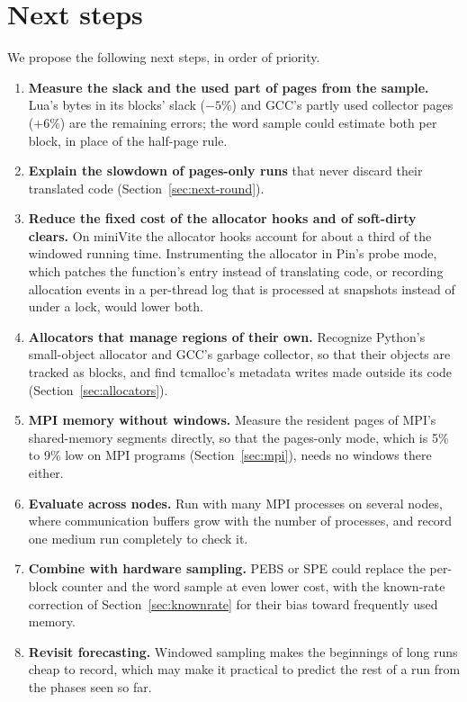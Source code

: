 \documentclass[11pt]{article}
\newcommand{\secref}[1]{Section~\ref{#1}}
\begin{document}
\section{Next steps}
\label{sec:next}

We propose the following next steps, in order of priority.
\begin{enumerate}
\item \textbf{Measure the slack and the used part of pages from the sample.} Lua's bytes in its blocks' slack ($-5\%$) and GCC's partly used collector pages ($+6\%$) are the remaining errors; the word sample could estimate both per block, in place of the half-page rule.
\item \textbf{Explain the slowdown of pages-only runs} that never discard their translated code (\secref{sec:next-round}).
\item \textbf{Reduce the fixed cost of the allocator hooks and of soft-dirty clears.} On miniVite the allocator hooks account for about a third of the windowed running time. Instrumenting the allocator in Pin's probe mode, which patches the function's entry instead of translating code, or recording allocation events in a per-thread log that is processed at snapshots instead of under a lock, would lower both.
\item \textbf{Allocators that manage regions of their own.} Recognize Python's small-object allocator and GCC's garbage collector, so that their objects are tracked as blocks, and find tcmalloc's metadata writes made outside its code (\secref{sec:allocators}).
\item \textbf{MPI memory without windows.} Measure the resident pages of MPI's shared-memory segments directly, so that the pages-only mode, which is 5\% to 9\% low on MPI programs (\secref{sec:mpi}), needs no windows there either.
\item \textbf{Evaluate across nodes.} Run with many MPI processes on several nodes, where communication buffers grow with the number of processes, and record one medium run completely to check it.
\item \textbf{Combine with hardware sampling.} PEBS or SPE could replace the per-block counter and the word sample at even lower cost, with the known-rate correction of \secref{sec:knownrate} for their bias toward frequently used memory.
\item \textbf{Revisit forecasting.} Windowed sampling makes the beginnings of long runs cheap to record, which may make it practical to predict the rest of a run from the phases seen so far.
\end{enumerate}
\end{document}
